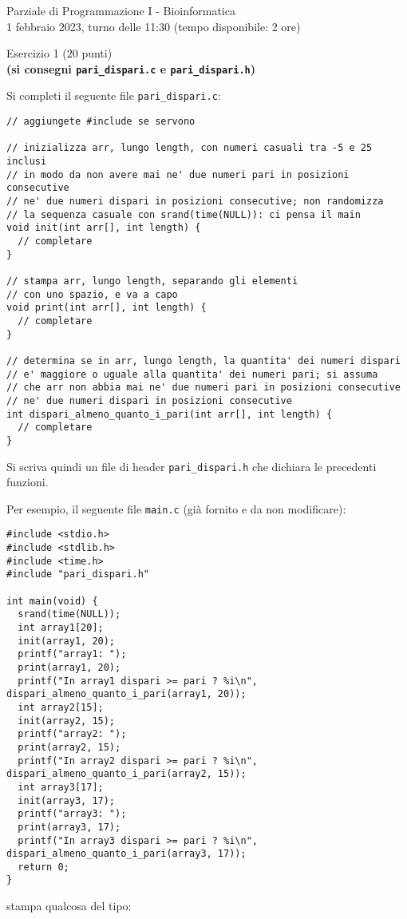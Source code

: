\documentclass[12pt]{article}
\begin{document}
\begin{center}{\LARGE Parziale di Programmazione I - Bioinformatica}\\
  \large 1 febbraio 2023, turno delle 11:30 (tempo disponibile: 2 ore)
\end{center}

\vspace*{1ex}
\begin{center}{\Large Esercizio 1} ($20$ punti)\\
  \textbf{(si consegni \texttt{pari\_dispari.c} e \texttt{pari\_dispari.h})}
\end{center}

Si completi il seguente file \texttt{pari\_dispari.c}:

\begin{center}
\begin{lstlisting}[language=myC]
// aggiungete #include se servono

// inizializza arr, lungo length, con numeri casuali tra -5 e 25 inclusi
// in modo da non avere mai ne' due numeri pari in posizioni consecutive
// ne' due numeri dispari in posizioni consecutive; non randomizza
// la sequenza casuale con srand(time(NULL)): ci pensa il main
void init(int arr[], int length) {
  // completare
}

// stampa arr, lungo length, separando gli elementi
// con uno spazio, e va a capo
void print(int arr[], int length) {
  // completare
}

// determina se in arr, lungo length, la quantita' dei numeri dispari
// e' maggiore o uguale alla quantita' dei numeri pari; si assuma
// che arr non abbia mai ne' due numeri pari in posizioni consecutive
// ne' due numeri dispari in posizioni consecutive
int dispari_almeno_quanto_i_pari(int arr[], int length) {
  // completare
}
\end{lstlisting}
\end{center}
%
Si scriva quindi un file di header \texttt{pari\_dispari.h} che dichiara le precedenti funzioni.

Per esempio, il seguente file \texttt{main.c}
(gi\`a fornito e da non modificare):

\begin{center}
  \begin{lstlisting}[language=myC]
#include <stdio.h>
#include <stdlib.h>
#include <time.h>
#include "pari_dispari.h"

int main(void) {
  srand(time(NULL));
  int array1[20];
  init(array1, 20);
  printf("array1: ");
  print(array1, 20);
  printf("In array1 dispari >= pari ? %i\n", dispari_almeno_quanto_i_pari(array1, 20));
  int array2[15];
  init(array2, 15);
  printf("array2: ");
  print(array2, 15);
  printf("In array2 dispari >= pari ? %i\n", dispari_almeno_quanto_i_pari(array2, 15));
  int array3[17];
  init(array3, 17);
  printf("array3: ");
  print(array3, 17);
  printf("In array3 dispari >= pari ? %i\n", dispari_almeno_quanto_i_pari(array3, 17));
  return 0;
}
  \end{lstlisting}
\end{center}
stampa qualcosa del tipo:
\end{document}
